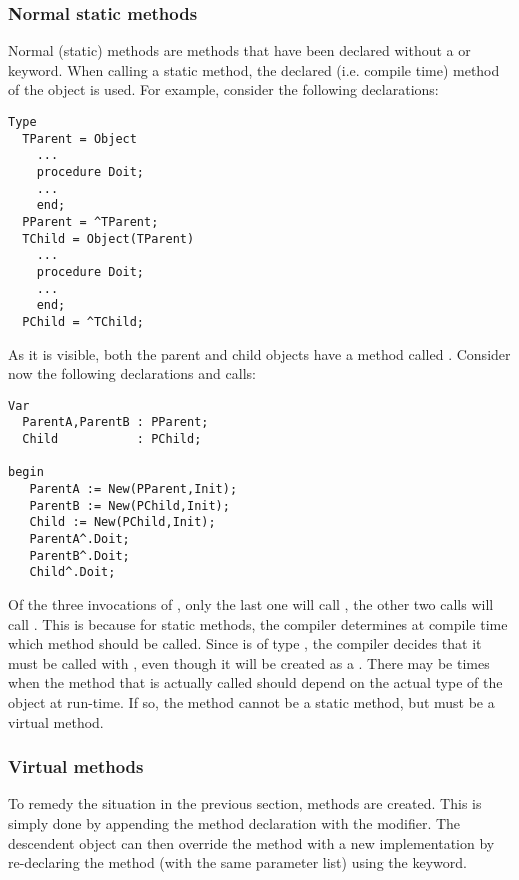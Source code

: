 \subsubsection{Normal static methods}
Normal (static) methods are methods that have been declared without a 
or  keyword. When calling a static method, the declared (i.e.
compile time) method of the object is used.
For example, consider the following declarations:
\begin{verbatim}
Type
  TParent = Object
    ...
    procedure Doit;
    ...
    end;
  PParent = ^TParent;
  TChild = Object(TParent)
    ...
    procedure Doit;
    ...
    end;
  PChild = ^TChild;
\end{verbatim}
As it is visible, both the parent and child objects have a method called
. Consider now the following declarations and calls:
\begin{verbatim}
Var 
  ParentA,ParentB : PParent;
  Child           : PChild;

begin
   ParentA := New(PParent,Init);
   ParentB := New(PChild,Init);
   Child := New(PChild,Init);
   ParentA^.Doit;
   ParentB^.Doit;
   Child^.Doit;
\end{verbatim}
Of the three invocations of , only the last one will call
, the other two calls will call .
This is because for static methods, the compiler determines at compile
time which method should be called. Since  is of type
, the compiler decides that it must be called with
, even though it will be created as a .
There may be times when the method that is actually called should
depend on the actual type of the object at run-time. If so, the method
cannot be a static method, but must be a virtual method.

\subsubsection{Virtual methods}
To remedy the situation in the previous section,  methods are
created. This is simply done by appending the method declaration with the
 modifier. The descendent object can then override the method
with a new implementation by re-declaring the method (with the same
parameter list) using the  keyword.

